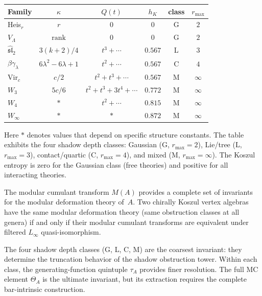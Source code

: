 \begin{computation}

\smallskip
\begin{center}
\begin{tabular}{l c c c c c}
Family & $\kappa$ & $Q(t)$ & $h_K$ & class & $r_{\max}$ \\
\hline
Heis$_r$ & $r$ & $0$ & $0$ & G & $2$ \\
$V_\Lambda$ & $\mathrm{rank}$ & $0$ & $0$ & G & $2$ \\
$\widehat{\mathfrak{sl}}_2$ & $3(k+2)/4$ & $t^3+\cdots$ & $0.567$ & L & $3$ \\
$\beta\gamma_\lambda$ & $6\lambda^2{-}6\lambda{+}1$ & $t^2+\cdots$ & $0.567$ & C & $4$ \\
Vir$_c$ & $c/2$ & $t^2+t^3+\cdots$ & $0.567$ & M & $\infty$ \\
$W_3$ & $5c/6$ & $t^2+t^3+3t^4+\cdots$ & $0.772$ & M & $\infty$ \\
$W_4$ & $*$ & $t^2+\cdots$ & $0.815$ & M & $\infty$ \\
$W_\infty$ & $*$ & $*$ & $0.872$ & M & $\infty$
\end{tabular}
\end{center}

\smallskip
\noindent
Here $*$ denotes values that depend on specific structure constants.
The table exhibits the four shadow depth classes: Gaussian (G, $r_{\max}=2$),
Lie/tree (L, $r_{\max}=3$), contact/quartic (C, $r_{\max}=4$), and
mixed (M, $r_{\max}=\infty$). The Koszul entropy is zero for the
Gaussian class (free theories) and positive for all interacting theories.
\end{computation}

\begin{remark}
The modular cumulant transform $M(A)$ provides a complete set of
invariants for the modular deformation theory of~$A$. Two chirally
Koszul vertex algebras have the same modular deformation theory
(same obstruction classes at all genera) if and only if their
modular cumulant transforms are equivalent under filtered
$L_\infty$ quasi-isomorphism.

The four shadow depth classes (G, L, C, M) are the coarsest invariant:
they determine the truncation behavior of the shadow obstruction tower. Within
each class, the generating-function quintuple $\tau_A$ provides finer
resolution. The full MC element $\Theta_A$ is the ultimate invariant,
but its extraction requires the complete bar-intrinsic construction.
\end{remark}

